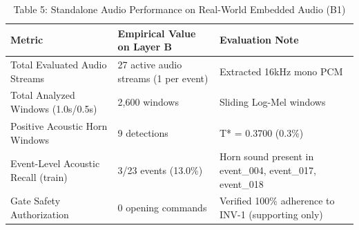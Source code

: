 \begin{table}[t]
\centering
\caption{Table 5: Standalone Audio Performance on Real-World Embedded Audio (B1)}
\label{tab:table05_audio_layerb_performance}
\begin{tabular}{lll}
\hline
Metric & Empirical Value on Layer B & Evaluation Note \\
\hline
Total Evaluated Audio Streams & 27 active audio streams (1 per event) & Extracted 16kHz mono PCM \\
Total Analyzed Windows (1.0s/0.5s) & 2,600 windows & Sliding Log-Mel windows \\
Positive Acoustic Horn Windows & 9 detections & T* = 0.3700 (0.3\%) \\
Event-Level Acoustic Recall (train) & 3/23 events (13.0\%) & Horn sound present in event\_004, event\_017, event\_018 \\
Gate Safety Authorization & 0 opening commands & Verified 100\% adherence to INV-1 (supporting only) \\
\hline
\end{tabular}
\end{table}
